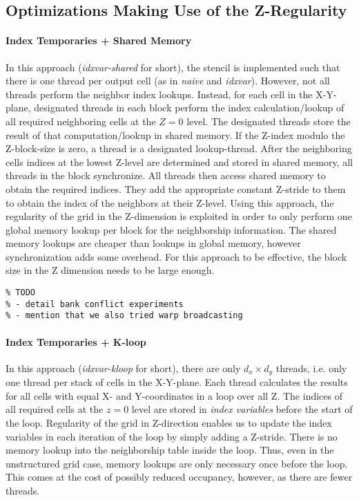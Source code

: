 \subsection{Optimizations Making Use of the Z-Regularity}

\paragraph{Index Temporaries + Shared Memory} In this approach (\emph{idxvar-shared} for short), the stencil is implemented such that there is one thread per output cell (as in \emph{naive} and \emph{idxvar}). However, not all threads perform the neighbor index lookups. Instead, for each cell in the X-Y-plane, designated threads in each block perform the index calculation/lookup of all required neighboring cells at the $Z=0$ level. The designated threads store the result of that computation/lookup in shared memory. If the Z-index modulo the Z-block-size is zero, a thread is a designated lookup-thread. After the neighboring cells indices at the lowest Z-level are determined and stored in shared memory, all threads in the block synchronize. All threads then access shared memory to obtain the required indices. They add the appropriate constant Z-stride to them to obtain the index of the neighbors at their Z-level. Using this approach, the regularity of the grid in the Z-dimension is exploited in order to only perform one global memory lookup per block for the neighborship information. The shared memory lookups are cheaper than lookups in global memory, however synchronization adds some overhead. For this approach to be effective, the block size in the Z dimension needs to be large enough.

\begin{verbatim}
% TODO
% - detail bank conflict experiments
% - mention that we also tried warp broadcasting
\end{verbatim}

\paragraph{Index Temporaries + K-loop} In this approach (\emph{idxvar-kloop} for short), there are only $d_x\times d_y$ threads, i.e. only one thread per stack of cells in the X-Y-plane. Each thread calculates the results for all cells with equal X- and Y-coordinates in a loop over all Z. The indices of all required cells at the $z=0$ level are stored in \emph{index variables} before the start of the loop. Regularity of the grid in Z-direction enables us to update the index variables in each iteration of the loop by simply adding a Z-stride. There is no memory lookup into the neighborship table inside the loop. Thus, even in the unstructured grid case, memory lookups are only necessary once before the loop. This comes at the cost of possibly reduced occupancy, however, as there are fewer threads.

